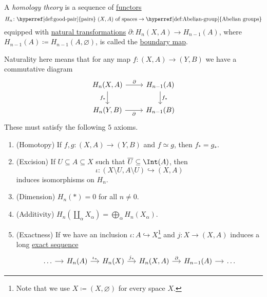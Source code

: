 \begin{definition}\label{def:homology-theory}
	A \emph{homology theory} is a sequence of \hyperref[def:functor]{functors}
	\[
		H_n \colon \text{\hyperref[def:good-pair]{pairs} \((X, A)\) of spaces} \to \text{\hyperref[def:Abelian-group]{Abelian groups}}
	\]
	equipped with \hyperref[def:natural-transformation]{natural transformations} \(\partial \colon H_n(X, A) \to H_{n - 1}(A)\),
	where \(H_{n - 1}(A) \coloneqq H_{n - 1}(A, \varnothing)\), is called the \underline{boundary map}.

	Naturality here means that for any map \(f \colon (X, A) \to (Y, B)\) we have a commutative diagram
	\[
		\begin{tikzcd}
			{H_{n}(X, A)} & {H_{n-1}(A)} \\
			{H_n(Y, B)} & {H_{n-1}(B)}
			\arrow["{\partial }", from=1-1, to=1-2]
			\arrow["{f_\ast}", from=1-2, to=2-2]
			\arrow["{\partial }"', from=2-1, to=2-2]
			\arrow["{f_\ast}"', from=1-1, to=2-1]
		\end{tikzcd}
	\]
	These must satisfy the following \(5\) axioms.
	\begin{enumerate}[(1)]
		\item (Homotopy) If \(f, g \colon (X, A) \to (Y, B)\) and \(f \simeq g\), then \(f_\ast = g_\ast\).
		\item (Excision) If \(U \subseteq A \subseteq X\) such that \(\overline{U} \subseteq \Int  (A)\), then
		      \[
			      \iota \colon (X \setminus U, A \setminus U) \hookrightarrow (X, A)
		      \]
		      induces isomorphisms on \(H_n\).
		\item (Dimension) \(H_n(\ast) = 0\) for all \(n \neq 0\).
		\item (Additivity) \(H_n\left(\coprod_\alpha X_\alpha\right) = \bigoplus_\alpha H_n(X_\alpha)\).
		\item (Exactness) If we have an inclusion \(\iota \colon A \hookrightarrow X\)\footnote{Note that we use
			      \(X\coloneqq (X, \varnothing )\) for every space \(X\).} and \(j \colon X \to (X, A)\) induces a
		      long \hyperref[def:exact-sequence]{exact sequence}
		      \[
			      \begin{tikzcd}[column sep=small]
				      \dots & {H_n(A)} & {H_n(X)} & {H_{n}(X, A)} & {H_{n-1}(A)} & \dots
				      \arrow[from=1-1, to=1-2]
				      \arrow["{\iota_\ast}", from=1-2, to=1-3]
				      \arrow["{j_\ast}", from=1-3, to=1-4]
				      \arrow["\partial", from=1-4, to=1-5]
				      \arrow[from=1-5, to=1-6]
			      \end{tikzcd}
		      \]
	\end{enumerate}
\end{definition}

